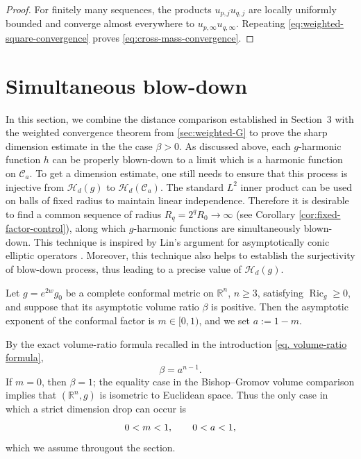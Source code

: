 \documentclass[12pt]{amsart}
\theoremstyle{plain}
\theoremstyle{definition}
\theoremstyle{remark}     %
\numberwithin{equation}{section}
\begin{document}
\begin{proof}
For finitely many sequences, the products
$u_{p,j}u_{q,j}$ are locally uniformly bounded and converge almost
everywhere to $u_{p,\infty}u_{q,\infty}$.  Repeating
\cref{eq:weighted-square-convergence} proves
\cref{eq:cross-mass-convergence}.

\end{proof}




\section{Simultaneous blow-down}
\label{sec:positive-avr-dimension}

In this section, we combine the distance comparison established in
Section~3 with the weighted convergence theorem from
\cref{sec:weighted-G} to prove the sharp dimension estimate in the
the case $\beta>0$. As discussed above, each $g$-harmonic function $h$ can be properly blown-down to a limit which is a harmonic function on $\mathcal{C}_a$. To get a dimension estimate, one still needs to ensure that this process is injective from $\mathcal{H}_d(g)$ to $\mathcal{H}_d(\mathcal{C}_a)$. The standard $L^2$ inner product can be used on balls of fixed radius to maintain linear independence. Therefore it is desirable to find a common sequence of radius $R_q=2^q R_0\to \infty$ (see Corollary \ref{cor:fixed-factor-control}), along which $g$-harmonic functions are simultaneously blown-down. This technique is inspired by Lin's argument for asymptotically conic elliptic operators \cite[Theorem 2.13]{L}. Moreover, this technique also helps to establish the surjectivity of blow-down process, thus leading to a precise value of $\mathcal{H}_d(g)$. 

Let $g=e^{2w}g_0$ be a complete conformal metric on $\mathbb R^n$, $n\geq3$, satisfying $\operatorname{Ric}_g\geq0$, and suppose that its asymptotic volume ratio $\beta$ is positive.  Then the asymptotic exponent of the conformal factor is $m\in[0,1)$, and we set $a:=1-m.$

By the exact volume-ratio formula recalled in the introduction \cref{eq. volume-ratio formula},
\[
    \beta=a^{n-1}.
\]
If $m=0$, then $\beta=1$; the equality case in the Bishop--Gromov volume
comparison implies that $(\mathbb R^n,g)$ is isometric to Euclidean space.
Thus the only case in which a strict dimension drop can occur is
\begin{equation}\notag
    0<m<1,
    \qquad 0<a<1,
\end{equation}
which we assume througout the section.
\end{document}

